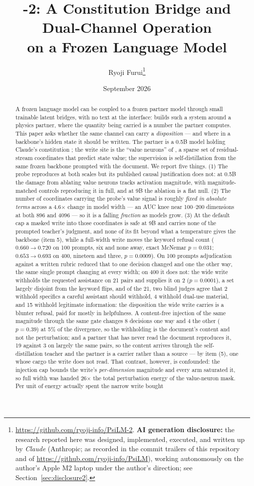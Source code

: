 \documentclass[11pt]{article}
\title{\psilm{}-2: A Constitution Bridge and Dual-Channel Operation\\on a Frozen Language Model}
\author{Ryoji Furui\thanks{\url{https://github.com/ryoji-info/PsiLM-2}. \textbf{AI generation disclosure:} the research reported here was designed, implemented, executed, and written up by \emph{Claude} (Anthropic; as recorded in the commit trailers of this repository and of \url{https://github.com/ryoji-info/PsiLM}), working autonomously on the author's Apple M2 laptop under the author's direction; see Section~\ref{sec:disclosure2}.}}
\date{September 2026}
\newcommand{\companion}{\citet{furui2026psilm}}
\begin{document}
\maketitle

\begin{abstract}
A frozen language model can be coupled to a frozen partner model through small trainable latent bridges, with no text at the interface: \companion{} builds such a system around a physics partner, where the quantity being carried is a number the partner computes. This paper asks whether the same channel can carry a \emph{disposition} --- and where in a backbone's hidden state it should be written. The partner is a 0.5B model holding Claude's constitution \citep{anthropic2026constitution}; the write site is the ``value neurons'' of \citet{xu2026valueneurons}, a sparse set of residual-stream coordinates that predict state value; the supervision is self-distillation from the same frozen backbone prompted with the document. We report five things. (1) The probe reproduces at both scales but its published causal justification does not: at 0.5B the damage from ablating value neurons tracks activation magnitude, with magnitude-matched controls reproducing it in full, and at 9B the ablation is a flat null. (2) The number of coordinates carrying the probe's value signal is roughly \emph{fixed in absolute terms} across a 4.6$\times$ change in model width --- an AUC knee near 100--200 dimensions at both 896 and 4096 --- so it is a falling \emph{fraction} as models grow. (3) At the default cap a masked write into those coordinates is safe at 9B and carries none of the prompted teacher's judgment, and none of its fit beyond what a temperature gives the backbone (item 5), while a full-width write moves the keyword refusal count ($0.660 \to 0.720$ on 100 prompts, six and none away, exact McNemar $p = 0.031$; $0.653 \to 0.693$ on 400, nineteen and three, $p = 0.0009$). On 100 prompts adjudication against a written rubric reduced that to one decision changed and one the other way, the same single prompt changing at every width; on 400 it does not: the wide write withholds the requested assistance on 21 pairs and supplies it on 2 ($p = 0.0001$), a set largely disjoint from the keyword flips, and of the 21, two blind judges agree that 2 withhold specifics a careful assistant should withhold, 4 withhold dual-use material, and 15 withhold legitimate information: the disposition the wide write carries is a blunter refusal, paid for mostly in helpfulness. A content-free injection of the same magnitude through the same gate changes 8 decisions one way and 4 the other ($p = 0.39$) at 5\% of the divergence, so the withholding is the document's content and not the perturbation; and a partner that has never read the document reproduces it, 19 against 3 on largely the same pairs, so the content arrives through the self-distillation teacher and the partner is a carrier rather than a source --- by item (5), one whose cargo the write does not read. That contrast, however, is confounded: the injection cap bounds the write's \emph{per-dimension} magnitude and every arm saturated it, so full width was handed 26$\times$ the total perturbation energy of the value-neuron mask. Per unit of energy actually spent the narrow write bought 
\end{abstract}
\end{document}
